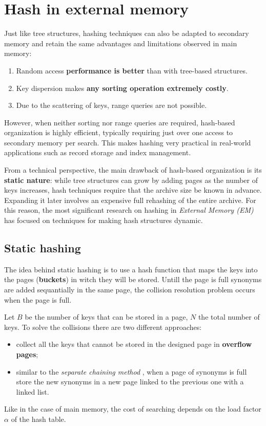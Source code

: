 \documentclass{report}
\begin{document}
\section{Hash in external memory}
Just like tree structures, hashing techniques can also be adapted to secondary memory and retain the same advantages and limitations observed in main memory:

\begin{enumerate}
    \item Random access \textbf{performance is better} than with tree-based structures.
    \item Key dispersion makes \textbf{any sorting operation extremely costly}.
    \item Due to the scattering of keys, range queries are not possible.
\end{enumerate}
\noindent
However, when neither sorting nor range queries are required, hash-based organization is highly efficient, typically requiring just over one access to secondary memory per search. This makes hashing very practical in real-world applications such as record storage and index management.

From a technical perspective, the main drawback of hash-based organization is its \textbf{{static nature}}: 
while tree structures can grow by adding pages as the number of keys increases, hash techniques require that the archive size be known in advance. Expanding it later involves an expensive full rehashing of the entire archive. For this reason, the most significant research on hashing in \textit{External Memory (EM)} has focused on techniques for making hash structures dynamic.
\subsection{Static hashing}
The idea behind static hashing is to use a hash function that maps the keys into the pages (\textbf{buckets}) in witch they will be stored. Untill the page is full synonyms are added sequantially in the same page, the collision resolution problem occurs when the page is full.

Let \(B\) be the number of keys that can be stored in a page, \(N\) the total number of keys. To solve the collisions there are two different approaches:
\begin{itemize}
    \item collect all the keys that cannot be stored in the designed page in \textbf{overflow pages};
    \item similar to the \textit{separate chaining method} , when a page of synonyms is full store the new synonyms in a new page linked to the previous one with a linked list.
\end{itemize}
\noindent Like in the case of main memory, the cost of searching depends on the load factor \(\alpha\) of the hash table.
\end{document}
